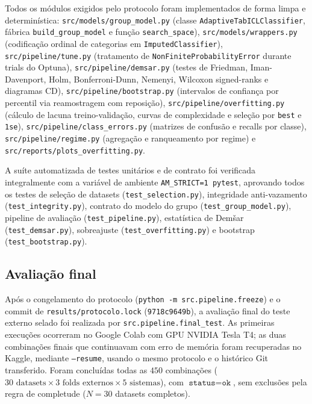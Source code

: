 \documentclass[11pt,a4paper]{article}
\begin{document}
Todos os módulos exigidos pelo protocolo foram implementados de forma limpa e determinística: \texttt{src/models/group\_model.py} (classe \texttt{AdaptiveTabICLClassifier}, fábrica \texttt{build\_group\_model} e função \texttt{search\_space}), \texttt{src/models/wrappers.py} (codificação ordinal de categorias em \texttt{ImputedClassifier}), \texttt{src/pipeline/tune.py} (tratamento de \texttt{NonFiniteProbabilityError} durante trials do Optuna), \texttt{src/pipeline/demsar.py} (testes de Friedman, Iman-Davenport, Holm, Bonferroni-Dunn, Nemenyi, Wilcoxon signed-ranks e diagramas CD), \texttt{src/pipeline/bootstrap.py} (intervalos de confiança por percentil via reamostragem com reposição), \texttt{src/pipeline/overfitting.py} (cálculo de lacuna treino-validação, curvas de complexidade e seleção por \texttt{best} e \texttt{1se}), \texttt{src/pipeline/class\_errors.py} (matrizes de confusão e recalls por classe), \texttt{src/pipeline/regime.py} (agregação e ranqueamento por regime) e \texttt{src/reports/plots\_overfitting.py}.

A suíte automatizada de testes unitários e de contrato foi verificada integralmente com a variável de ambiente \texttt{AM\_STRICT=1 pytest}, aprovando todos os testes de seleção de datasets (\texttt{test\_selection.py}), integridade anti-vazamento (\texttt{test\_integrity.py}), contrato do modelo do grupo (\texttt{test\_group\_model.py}), pipeline de avaliação (\texttt{test\_pipeline.py}), estatística de Demšar (\texttt{test\_demsar.py}), sobreajuste (\texttt{test\_overfitting.py}) e bootstrap (\texttt{test\_bootstrap.py}).

\subsection{Avaliação final}
\label{sec:val_vs_test}

Após o congelamento do protocolo (\texttt{python -m src.pipeline.freeze}) e o commit de \texttt{results/protocolo.lock} (\texttt{9718c9649b}), a avaliação final do teste externo selado foi realizada por \texttt{src.pipeline.final\_test}. As primeiras execuções ocorreram no Google Colab com GPU NVIDIA Tesla T4; as duas combinações finais que continuavam com erro de memória foram recuperadas no Kaggle, mediante \texttt{--resume}, usando o mesmo protocolo e o histórico Git transferido. Foram concluídas todas as $450$ combinações ($30\text{ datasets} \times 3\text{ folds externos} \times 5\text{ sistemas}$), com $\texttt{status} = \texttt{ok}$, sem exclusões pela regra de completude ($N = 30$ datasets completos).
\end{document}
